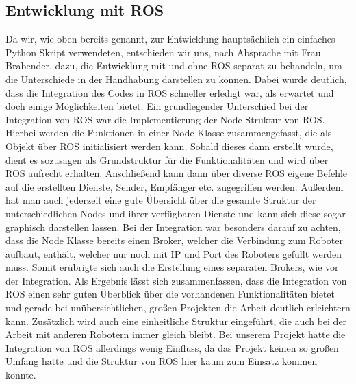 \documentclass{scrartcl}
\begin{document}
\subsection{Entwicklung mit ROS}
Da wir, wie oben bereits genannt, zur Entwicklung hauptsächlich ein einfaches Python Skript verwendeten, entschieden wir uns, nach Absprache mit Frau Brabender, dazu, die Entwicklung mit und ohne ROS separat zu behandeln, um die Unterschiede in der Handhabung darstellen zu können. Dabei wurde deutlich, dass die Integration des Codes in ROS schneller erledigt war, als erwartet und doch einige Möglichkeiten bietet. Ein grundlegender Unterschied bei der Integration von ROS war die Implementierung der Node Struktur von ROS. Hierbei werden die Funktionen in einer Node Klasse zusammengefasst, die als Objekt über ROS initialisiert werden kann. Sobald dieses dann erstellt wurde, dient es sozusagen als Grundstruktur für die Funktionalitäten und wird über ROS aufrecht erhalten. Anschließend kann dann über diverse ROS eigene Befehle auf die erstellten Dienste, Sender, Empfänger etc. zugegriffen werden. Außerdem hat man auch jederzeit eine gute Übersicht über die gesamte Struktur der unterschiedlichen Nodes und ihrer verfügbaren Dienste und kann sich diese sogar graphisch darstellen lassen.
Bei der Integration war besonders darauf zu achten, dass die Node Klasse bereits einen Broker, welcher die Verbindung zum Roboter aufbaut, enthält, welcher nur noch mit IP und Port des Roboters gefüllt werden muss. Somit erübrigte sich auch die Erstellung eines separaten Brokers, wie vor der Integration.
Als Ergebnis lässt sich zusammenfassen, dass die Integration von ROS einen sehr guten Überblick über die vorhandenen Funktionalitäten bietet und gerade bei unübersichtlichen, großen Projekten die Arbeit deutlich erleichtern kann. Zusätzlich wird auch eine einheitliche Struktur eingeführt, die auch bei der Arbeit mit anderen Robotern immer gleich bleibt. Bei unserem Projekt hatte die Integration von ROS allerdings wenig Einfluss, da das Projekt keinen so großen Umfang hatte und die Struktur von ROS hier kaum zum Einsatz kommen konnte.

\newpage
\appendix 


 

 
 
\end{document}
